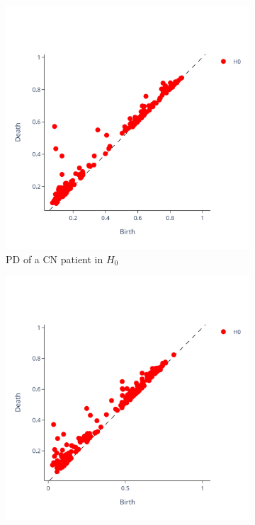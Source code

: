 \documentclass{article}
\begin{document}
\begin{figure}
  \centering
  \centering
  \begin{subfigure}{0.32\textwidth}
    \includegraphics[width=\textwidth]{figures/PDs/persistence_diagram_CN_H_0.png}
    \caption{PD of a CN patient in $H_0$}
  \end{subfigure}
  \begin{subfigure}{0.32\textwidth}
    \includegraphics[width=\textwidth]{figures/PDs/persistence_diagram_MCI_H_0.png}

\end{subfigure}
\end{figure}
\end{document}
